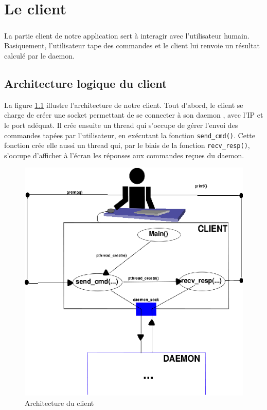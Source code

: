 
\chapter{Le client}

	\paragraph{}La partie client de notre application sert à interagir avec 
l'utilisateur humain. Basiquement, l'utilisateur tape des commandes et le 
client lui renvoie un résultat calculé par le daemon.
	
	\section{Architecture logique du client}

La figure \ref{client} illustre l'architecture de notre client. Tout d'abord, 
le client se charge de créer une socket permettant de se connecter à son daemon
, avec l'IP et le port adéquat. Il crée ensuite un thread qui s'occupe de gérer
 l'envoi des commandes tapées par l'utilisateur, en exécutant la fonction 
\verb"send_cmd()". Cette fonction crée elle aussi un thread qui, par le biais 
de la fonction \verb"recv_resp()", s'occupe d'afficher à l'écran les réponses 
aux commandes reçues du daemon.

\begin{center}
\begin{figure}[h]
    \centering
    \includegraphics[scale=1.4]{client/archi_client.eps}
    \caption{Architecture du client}
    \label{client}
\end{figure}
\end{center}
	
